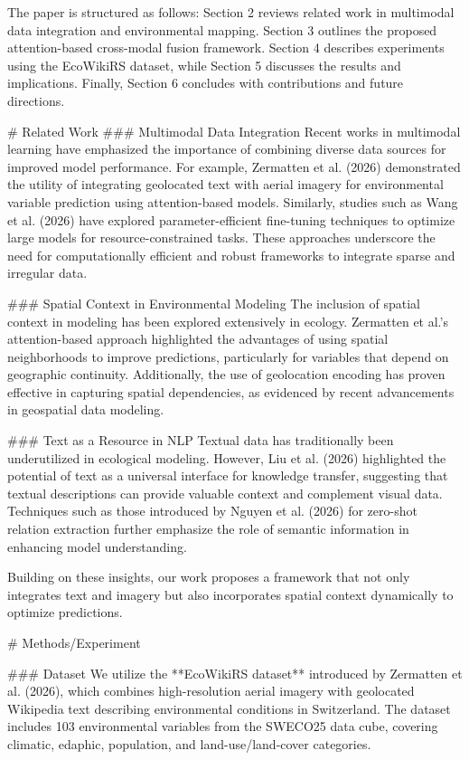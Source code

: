 The paper is structured as follows: Section 2 reviews related work in multimodal data integration and environmental mapping. Section 3 outlines the proposed attention-based cross-modal fusion framework. Section 4 describes experiments using the EcoWikiRS dataset, while Section 5 discusses the results and implications. Finally, Section 6 concludes with contributions and future directions.

# Related Work  
### Multimodal Data Integration  
Recent works in multimodal learning have emphasized the importance of combining diverse data sources for improved model performance. For example, Zermatten et al. (2026) demonstrated the utility of integrating geolocated text with aerial imagery for environmental variable prediction using attention-based models. Similarly, studies such as Wang et al. (2026) have explored parameter-efficient fine-tuning techniques to optimize large models for resource-constrained tasks. These approaches underscore the need for computationally efficient and robust frameworks to integrate sparse and irregular data.

### Spatial Context in Environmental Modeling  
The inclusion of spatial context in modeling has been explored extensively in ecology. Zermatten et al.'s attention-based approach highlighted the advantages of using spatial neighborhoods to improve predictions, particularly for variables that depend on geographic continuity. Additionally, the use of geolocation encoding has proven effective in capturing spatial dependencies, as evidenced by recent advancements in geospatial data modeling.

### Text as a Resource in NLP  
Textual data has traditionally been underutilized in ecological modeling. However, Liu et al. (2026) highlighted the potential of text as a universal interface for knowledge transfer, suggesting that textual descriptions can provide valuable context and complement visual data. Techniques such as those introduced by Nguyen et al. (2026) for zero-shot relation extraction further emphasize the role of semantic information in enhancing model understanding.

Building on these insights, our work proposes a framework that not only integrates text and imagery but also incorporates spatial context dynamically to optimize predictions.

# Methods/Experiment  

### Dataset  
We utilize the **EcoWikiRS dataset** introduced by Zermatten et al. (2026), which combines high-resolution aerial imagery with geolocated Wikipedia text describing environmental conditions in Switzerland. The dataset includes 103 environmental variables from the SWECO25 data cube, covering climatic, edaphic, population, and land-use/land-cover categories.

